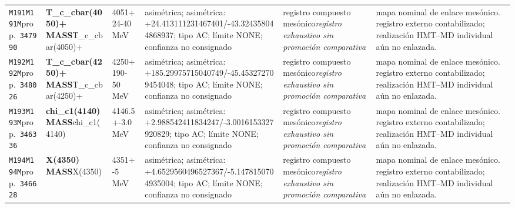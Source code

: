 \begin{landscape}
\begin{longtable}{L{1.85cm}L{4.45cm}L{2.35cm}L{4.05cm}L{3.35cm}L{7.15cm}}
\texttt{M191}\newline \texttt{M191M}\newline prop.\ \texttt{347990} & \textbf{T\_\allowbreak{}c\_\allowbreak{}cbar(4050)+ MASS}\newline T\_\allowbreak{}c\_\allowbreak{}cbar(4050)+ & 4051+24-40\,MeV & asimétrica; asimétrica: +24.413111231467401/-43.324358044868937; tipo AC; límite NONE; confianza no consignado & registro compuesto mesónico\newline \emph{registro exhaustivo sin promoción comparativa} & mapa nominal de enlace mesónico. registro externo contabilizado; realización HMT--MD individual aún no enlazada. \\
\texttt{M192}\newline \texttt{M192M}\newline prop.\ \texttt{348026} & \textbf{T\_\allowbreak{}c\_\allowbreak{}cbar(4250)+ MASS}\newline T\_\allowbreak{}c\_\allowbreak{}cbar(4250)+ & 4250+190-50\,MeV & asimétrica; asimétrica: +185.29975715040749/-45.453272709454048; tipo AC; límite NONE; confianza no consignado & registro compuesto mesónico\newline \emph{registro exhaustivo sin promoción comparativa} & mapa nominal de enlace mesónico. registro externo contabilizado; realización HMT--MD individual aún no enlazada. \\
\texttt{M193}\newline \texttt{M193M}\newline prop.\ \texttt{346336} & \textbf{chi\_\allowbreak{}c1(4140) MASS}\newline chi\_\allowbreak{}c1(4140) & 4146.5+-3.0\,MeV & asimétrica; asimétrica: +2.988542411834247/-3.0016153327920829; tipo AC; límite NONE; confianza no consignado & registro compuesto mesónico\newline \emph{registro exhaustivo sin promoción comparativa} & mapa nominal de enlace mesónico. registro externo contabilizado; realización HMT--MD individual aún no enlazada. \\
\texttt{M194}\newline \texttt{M194M}\newline prop.\ \texttt{346628} & \textbf{X(4350) MASS}\newline X(4350) & 4351+-5\,MeV & asimétrica; asimétrica: +4.6529560496527367/-5.1478150704935004; tipo AC; límite NONE; confianza no consignado & registro compuesto mesónico\newline \emph{registro exhaustivo sin promoción comparativa} & mapa nominal de enlace mesónico. registro externo contabilizado; realización HMT--MD individual aún no enlazada. \\

\end{longtable}
\end{landscape}
